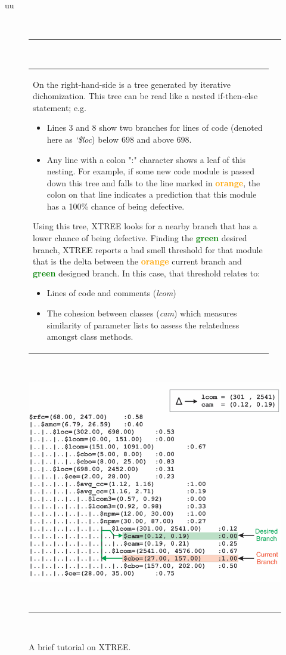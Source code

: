 uu \documentclass[final,twocolumn,5p]{elsarticle}
\theoremstyle{break}
\begin{document}
\begin{figure}[!t]
~\hrule~
\begin{minipage}{.53\linewidth}
\small
 \begin{tabular}{p{0.95\linewidth}} 
 On the right-hand-side is a tree
 generated by iterative dichomization. 
 This tree can be read like a nested if-then-else statement; e.g.
 \begin{itemize}
     \item Lines 3 and 8 show two branches for lines of code (denoted here as {\em `\$loc}) below 698 and above 698.
     \item Any line with a colon ":" character shows  a  leaf  of  this  nesting.   For  example,  if  some  new  code module is passed down this tree and falls to the line marked in \textcolor{orange}{{\bf orange}},  the colon on that line indicates a prediction that this module has a 100\% chance of being defective. 
     \end{itemize}
Using this tree,
 XTREE looks for a nearby branch that has a lower chance of being defective. Finding the \textcolor{green}{{\bf green}} desired  branch,  XTREE reports a bad smell threshold for that module that is the delta between the \textcolor{orange}{{\bf orange}}  current branch  and   \textcolor{green}{{\bf green}} designed branch. 
 In this case, that threshold relates to:
 \begin{itemize}
     \item Lines of code and comments ({\em lcom}) 
     \item The cohesion between classes ({\em cam}) which measures similarity of parameter lists to assess the relatedness amongst class   methods.
     \end{itemize}\\ 
 \end{tabular}
 \end{minipage}~~~~
 \begin{minipage}{.45\linewidth}
\includegraphics[width=\linewidth]{figs/XTREE_samp.png}
\end{minipage}
~\hrule~
 \caption{A brief tutorial on XTREE.} \label{fig:xtree_samp}
\end{figure}
\end{document}
